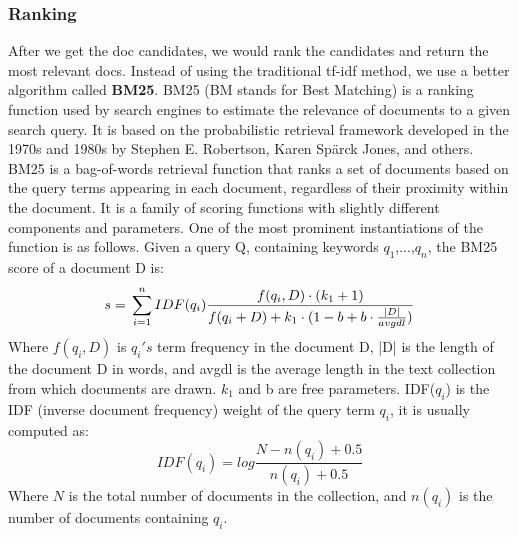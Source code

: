 \documentclass[10pt,times,twocolumn]{article}
\begin{document}
\subsubsection{Ranking}
After we get the doc candidates, we would rank the candidates and return the most relevant docs. 
Instead of using the traditional tf-idf method, we use a better algorithm called \textbf{BM25}. BM25 (BM stands for Best Matching) is a ranking function used by search engines to estimate the relevance of documents to a given search query. It is based on the probabilistic retrieval framework developed in the 1970s and 1980s by Stephen E. Robertson, Karen Spärck Jones, and others.
\newline
BM25 is a bag-of-words retrieval function that ranks a set of documents based on the query terms appearing in each document, regardless of their proximity within the document. It is a family of scoring functions with slightly different components and parameters. One of the most prominent instantiations of the function is as follows.
\newline
Given a query Q, containing keywords {$q_{1}$,...,$q_{n}$}, the BM25 score of a document D is:
\begin{equation}
    s=\\ \sum_{i=1}^{n}{IDF(q_i)\frac{f(q_i, D)\cdot (k_1+1)}{f(q_i+D)+k_1\cdot (1-b+b\cdot\frac{|D|}{avgdl})}}
\end{equation}
Where $f(q_i, D)$ is $q_i's$ term frequency in the document D, |D| is the length of the document D in words, 
and avgdl is the average length in the text collection from which documents are drawn. $k_{1}$ and b are free parameters. IDF($q_i$) is the IDF (inverse document frequency) weight of the query term $q_{i}$, 
it is usually computed as:
\begin{equation}
    IDF(q_i)=log\frac{N-n(q_i)+0.5}{n(q_i)+0.5}
\end{equation}
Where $N$ is the total number of documents in the collection, and 
$n(q_i)$ is the number of documents containing $q_i$.
\end{document}
